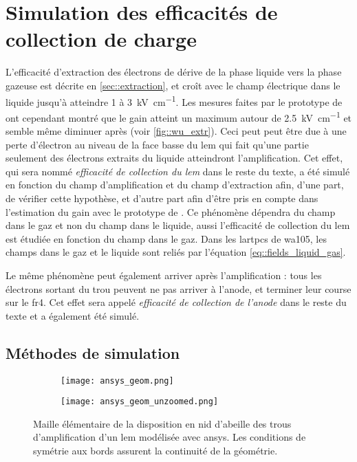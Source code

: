   \section{Simulation des efficacités de collection de charge}\label{sec::efficacites}
    
    L'efficacité d'extraction des électrons de dérive de la phase liquide vers la phase gazeuse est décrite en \autoref{sec::extraction}, et croît avec le champ électrique dans le liquide jusqu'à atteindre 1 à \SI{3}{\kilo\volt\per\centi\meter}. Les mesures faites par le prototype de \threeL{} ont cependant montré que le gain atteint un maximum autour de \SI{2.5}{\kilo\volt\per\centi\meter} et semble même diminuer après\cite{Wu2017} (voir \autoref{fig::wu_extr}). Ceci peut peut être due à une perte d'électron au niveau de la face basse du \gls{lem} qui fait qu'une partie seulement des électrons extraits du liquide atteindront l'amplification. Cet effet, qui sera nommé \textit{efficacité de collection du \gls{lem}} dans le reste du texte, a été simulé en fonction du champ d'amplification et du champ d'extraction afin, d'une part, de vérifier cette hypothèse, et d'autre part afin d'être pris en compte dans l'estimation du gain avec le prototype de \TOO{}. Ce phénomène dépendra du champ dans le gaz et non du champ dans le liquide, aussi l'efficacité de collection du \gls{lem} est étudiée en fonction du champ dans le gaz. Dans les \glspl{lartpc} de \gls{wa105}, les champs dans le gaz et le liquide sont reliés par l'équation \eqref{eq::fields_liquid_gas}.

    Le même phénomène peut également arriver après l'amplification : tous les électrons sortant du trou peuvent ne pas arriver à l'anode, et terminer leur course sur le \gls{fr4}. Cet effet sera appelé \textit{efficacité de collection de l'anode} dans le reste du texte et a également été simulé.
    
    \subsection{Méthodes de simulation}
        
      \begin{figure}[htpb]
        \begin{subfigure}[t]{0.48\textwidth}
          \texttt{[image: ansys\_geom.png]}
        \end{subfigure}
        \hfill
        \begin{subfigure}[t]{0.48\textwidth}
          \texttt{[image: ansys\_geom\_unzoomed.png]}
        \end{subfigure}
        \caption[Maille élémentaire d'un LEM modélisée avec ANSYS]{\label{fig::ansys_geom}Maille élémentaire de la disposition en nid d'abeille des trous d'amplification d'un \gls{lem} modélisée avec \gls{ansys}. Les conditions de symétrie aux bords assurent la continuité de la géométrie.}
      \end{figure}
            
